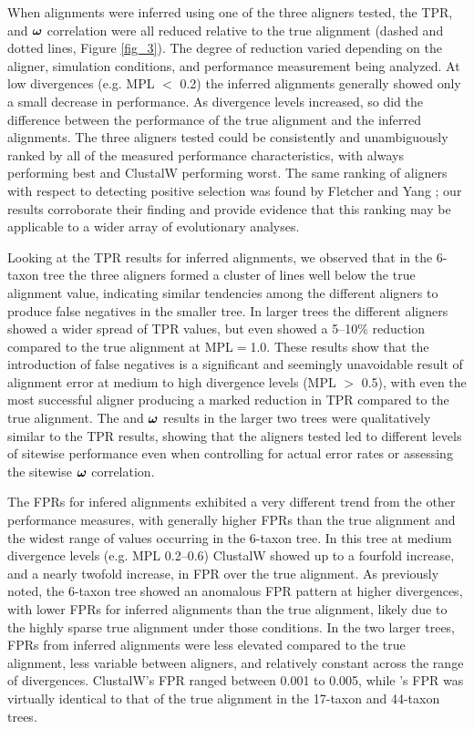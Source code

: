 \documentclass{article}
\begin{document}
When alignments were inferred using one of the three aligners tested,
the TPR, \tpr{} and $\bm{\omega}$ correlation were all reduced relative to
the true alignment (dashed and dotted lines, Figure \ref{fig_3}). The
degree of reduction varied depending on the aligner, simulation
conditions, and performance measurement being analyzed. At low
divergences (e.g. MPL $<$ 0.2) the inferred alignments generally
showed only a small decrease in performance. As divergence levels
increased, so did the difference between the performance of the true
alignment and the inferred alignments. The three aligners tested could
be consistently and unambiguously ranked by all of the measured
performance characteristics, with \prankc always performing best and
ClustalW performing worst. The same ranking of aligners with respect
to detecting positive selection was found by Fletcher and Yang
\citeyearpar{Fletcher2010Effect}; our results corroborate their
finding and provide evidence that this ranking may be applicable to a
wider array of evolutionary analyses.

Looking at the TPR results for inferred alignments, we observed that
in the 6-taxon tree the three aligners formed a cluster of lines well
below the true alignment value, indicating similar tendencies among
the different aligners to produce false negatives in the smaller
tree. In larger trees the different aligners showed a wider spread of
TPR values, but even \prankc{} showed a 5--10\% reduction compared to
the true alignment at MPL$=$1.0. These results show that the
introduction of false negatives is a significant and seemingly
unavoidable result of alignment error at medium to high divergence
levels (MPL $>$ 0.5), with even the most successful aligner producing
a marked reduction in TPR compared to the true alignment. The \tpr and
$\bm{\omega}$ results in the larger two trees were qualitatively similar to
the TPR results, showing that the aligners tested led to different
levels of sitewise performance even when controlling for actual error
rates or assessing the sitewise $\bm{\omega}$ correlation.

The FPRs for infered alignments exhibited a very different trend from
the other performance measures, with generally higher FPRs than the
true alignment and the widest range of values occurring in the 6-taxon
tree. In this tree at medium divergence levels (e.g. MPL 0.2--0.6)
ClustalW showed up to a fourfold increase, and \prankc{} a nearly
twofold increase, in FPR over the true alignment. As previously noted,
the 6-taxon tree showed an anomalous FPR pattern at higher
divergences, with lower FPRs for inferred alignments than the true
alignment, likely due to the highly sparse true alignment under those
conditions. In the two larger trees, FPRs from inferred alignments
were less elevated compared to the true alignment, less variable
between aligners, and relatively constant across the range of
divergences. ClustalW's FPR ranged between 0.001 to 0.005, while
\prankc{}'s FPR was virtually identical to that of the true alignment in the
17-taxon and 44-taxon trees.
\end{document}

